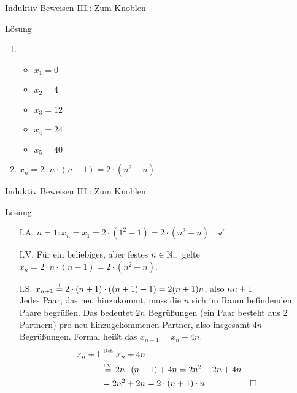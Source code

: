 \begin{frame}{Induktiv Beweisen III.: Zum Knoblen}
	\begin{block}{Lösung}
		\begin{enumerate}
			\item \begin{itemize}
				\item $x_1 = 0$
				\item $x_2 = 4$
				\item $x_3 = 12$
				\item $x_4 = 24$
				\item $x_5 = 40$
			\end{itemize}
			\item $x_n = 2 \cdot n \cdot (n-1) = 2 \cdot (n^2 -n)$
		\end{enumerate}
	\end{block}
\end{frame}

\begin{frame}{Induktiv Beweisen III.: Zum Knoblen}
	\begin{block}{Lösung}
		\begin{itemize}
			\item[I.A.] $n=1: x_n = x_1 = 2 \cdot (1^2 -1 ) = 2 \cdot (n^2 -n) \quad \checkmark$
			\item[I.V.] Für ein beliebiges, aber festes $n \in \mathbb{N}_+$ gelte $x_n = 2 \cdot n \cdot (n-1) = 2 \cdot (n^2 -n)$.
			\item[I.S.] \zz $x_{n+1} \eqtext{!} 2 \cdot (n+1) \cdot ((n+1)-1) = 2(n+1)n$, also $n \notStephan{\leadsto} \Stephan{\curvearrowright} n+1$\\
			Jedes Paar, das neu hinzukommt, muss die $n$ sich im Raum befindenden Paare begrüßen. Das bedeutet $2n$ Begrüßungen (ein Paar besteht aus $2$ Partnern) pro neu hinzugekommenen Partner, also insgesamt $4n$ Begrüßungen. Formal heißt das $x_{n+1} = x_n + 4n$.
			\begin{align*}
				x_n+1 	&\eqtext{Def.} x_n + 4n \\
						&\eqtext{I.V.} 2n \cdot (n-1) + 4n = 2n^2 - 2n +4n\\
						&= 2n^2 + 2n = 2 \cdot (n+1) \cdot n &\qedwhite{}
			\end{align*}

		\end{itemize}
	\end{block}
\end{frame}




